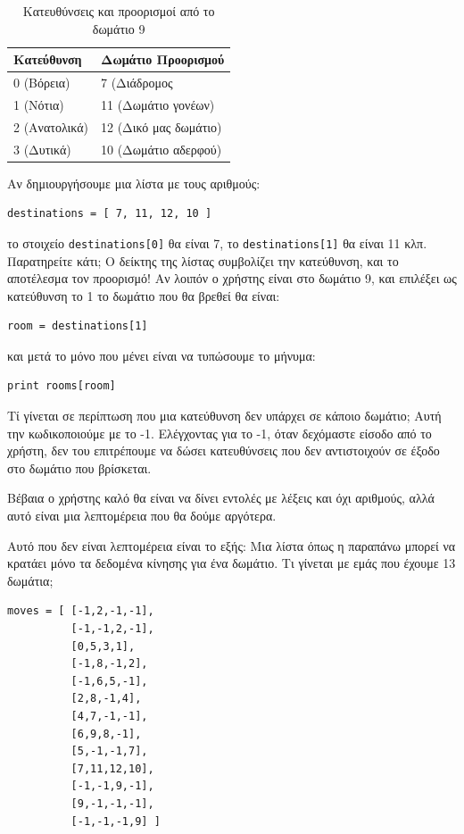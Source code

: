 \begin{table}[H]
\begin{center}
\begin{tabular}{|l|l|}
\hline
  \textbf{Κατεύθυνση} & \textbf{Δωμάτιο Προορισμού} \\
\hline
0 (Βόρεια) & 7 (Διάδρομος \\
\hline
1 (Νότια) & 11 (Δωμάτιο γονέων) \\
\hline
2 (Ανατολικά) & 12 (Δικό μας δωμάτιο) \\
\hline
3 (Δυτικά) & 10 (Δωμάτιο αδερφού) \\
\hline
\end{tabular}
\end{center}
\caption{Κατευθύνσεις και προορισμοί από το δωμάτιο 9}
\label{t2-2}
\end{table}

Αν δημιουργήσουμε μια λίστα με τους αριθμούς:
%
\begin{verbatim}
destinations = [ 7, 11, 12, 10 ]
\end{verbatim}
%
το στοιχείο {\tt destinations[0]} θα είναι 7, το {\tt destinations[1]} θα είναι 11 κλπ.
Παρατηρείτε κάτι;
Ο δείκτης της λίστας συμβολίζει την κατεύθυνση, και το αποτέλεσμα τον
προορισμό! Αν λοιπόν ο χρήστης είναι στο δωμάτιο 9, και επιλέξει ως
κατεύθυνση το 1 το δωμάτιο που θα βρεθεί θα είναι:
%
\begin{verbatim}
room = destinations[1]
\end{verbatim}
%
και μετά το μόνο που μένει είναι να τυπώσουμε το μήνυμα:
%
\begin{verbatim}
print rooms[room]
\end{verbatim}
%
Τί γίνεται σε περίπτωση που μια κατεύθυνση δεν υπάρχει σε κάποιο δωμάτιο;
Αυτή την κωδικοποιούμε με το -1. Ελέγχοντας για το -1,  όταν δεχόμαστε
είσοδο από το χρήστη, δεν του επιτρέπουμε να δώσει κατευθύνσεις που δεν
αντιστοιχούν σε έξοδο στο δωμάτιο που βρίσκεται.

Βέβαια ο χρήστης καλό θα είναι να δίνει εντολές με λέξεις και όχι αριθμούς,
αλλά αυτό είναι μια λεπτομέρεια που θα δούμε αργότερα.

Αυτό που δεν είναι λεπτομέρεια είναι το εξής: Μια λίστα όπως η παραπάνω
μπορεί να κρατάει μόνο τα δεδομένα κίνησης για ένα δωμάτιο. Τι γίνεται με
εμάς που έχουμε 13 δωμάτια;

\begin{verbatim}
moves = [ [-1,2,-1,-1],
          [-1,-1,2,-1],
          [0,5,3,1],
          [-1,8,-1,2],
          [-1,6,5,-1],
          [2,8,-1,4],
          [4,7,-1,-1],
          [6,9,8,-1],
          [5,-1,-1,7],
          [7,11,12,10],
          [-1,-1,9,-1],
          [9,-1,-1,-1],
          [-1,-1,-1,9] ]
\end{verbatim}

